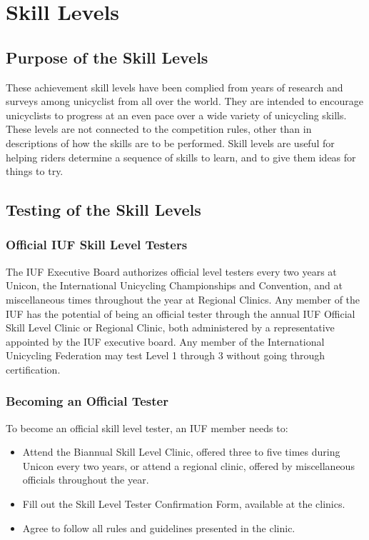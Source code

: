 \chapter{Skill Levels \label{chap:skill}}

\section{Purpose of the Skill Levels}
These achievement skill levels have been complied from years of research and surveys among unicyclist from all over the world.
They are intended to encourage unicyclists to progress at an even pace over a wide variety of unicycling skills.
These levels are not connected to the competition rules, other than in descriptions of how the skills are to be performed.
Skill levels are useful for helping riders determine a sequence of skills to learn, and to give them ideas for things to try.

\section{Testing of the Skill Levels}

\subsection{Official IUF Skill Level Testers}
The IUF Executive Board authorizes official level testers every two years at Unicon, the International Unicycling Championships and Convention, and at miscellaneous times throughout the year at Regional Clinics.
Any member of the IUF has the potential of being an official tester through the annual IUF Official Skill Level Clinic or Regional Clinic, both administered by a representative appointed by the IUF executive board.
Any member of the International Unicycling Federation may test Level 1 through 3 without going through certification.

\subsection{Becoming an Official Tester}
To become an official skill level tester, an IUF member needs to:
\begin{itemize}
\item Attend the Biannual Skill Level Clinic, offered three to five times during Unicon every two years, or attend a regional clinic, offered by miscellaneous officials throughout the year.
\item Fill out the Skill Level Tester Confirmation Form, available at the clinics.
\item Agree to follow all rules and guidelines presented in the clinic.
\end{itemize}


